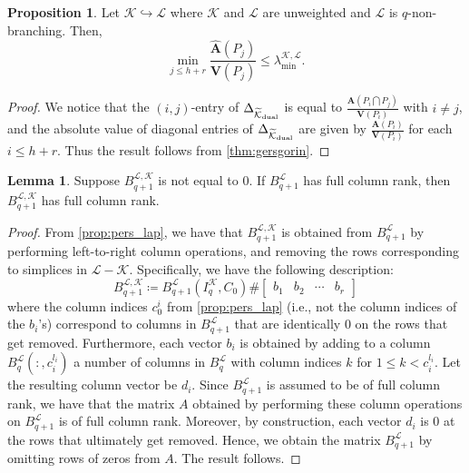 \documentclass{article}
\theoremstyle{definition}
\newtheorem{proposition}[theorem]{Proposition}
\newtheorem{lemma}[theorem]{Lemma}
\newcommand{\KK}{\mathcal{K}}
\newcommand{\LL}{\mathcal{L}}
\begin{document}
\begin{proposition}\label{prop:realcheeger1}
Let $\KK\hookrightarrow \LL$ where $\KK$ and $\LL$ are unweighted and $\LL$ is $q$-non-branching. Then,
\[
\min\limits_{j\leq h+r}\frac{\widehat{\mathbf{A}}(P_j)}{\mathbf{V}(P_j)}\leq \lambda_{\mathrm{min}}^{\KK, \LL}.\]
\end{proposition}

\begin{proof}
We notice that the $(i, j)$-entry of $\Delta_{\widetilde{\KK}_{\textrm{\textrm{dual}}}}$ is equal to $\frac{\mathbf{A}(P_i\bigcap P_j)}{\mathbf{V}(P_i)}$ with $i\neq j$,
and the absolute value of diagonal entries of $\Delta_{\widetilde{\KK}_{\textrm{\textrm{dual}}}}$ are given by $\frac{\mathbf{A}(P_i)}{\mathbf{V}(P_i)}$ for each $i\leq h+r$.
Thus the result follows from \cref{thm:gersgorin}.
\end{proof}


\begin{lemma}\label{lemma:full_col_rnk}
Suppose $B_{q+1}^{\LL, \KK}$ is not equal to $0$.
If $B_{q+1}^\LL$ has full column rank,
then $B_{q+1}^{\LL, \KK}$ has full column rank.
\end{lemma}
\begin{proof}
    From \cref{prop:pers_lap}, we have that $B_{q+1}^{\LL, \KK}$ is obtained from $B_{q+1}^\LL$ by performing left-to-right column operations, and removing the rows corresponding to simplices in $\LL-\KK$. Specifically, we have the following description: 
    \[B_{q+1}^{\LL, \KK}
    \coloneqq 
    B_{q+1}^\LL(I_q^{\KK}, C_0) \#
    \begin{bmatrix}
    b_1 & b_2 & \cdots & b_r
    \end{bmatrix}
    \]
    where the column indices $c_0^i$ from \cref{prop:pers_lap} (i.e., not the column indices of the $b_i$'s) correspond to columns in $B_{q+1}^\LL$ that are identically 0 on the rows that get removed. Furthermore,  each vector $b_i$ is obtained by adding to a column $B_q^\LL(:,c_i^{l_i})$ a number of columns in $B_q^\LL$ with column indices $k$ for $1\leq k< c_i^{l_i}$. Let the resulting column vector be $d_{i}$. Since $B_{q+1}^\LL$ is assumed to be of full column rank, we have that the matrix $A$ obtained by performing these column operations on $B_{q+1}^\LL$ is of full column rank. Moreover, by construction, each vector $d_{i}$ is 0 at the rows that ultimately get removed. Hence, we obtain the matrix $B_{q+1}^\LL$ by omitting rows of zeros from $A$. The result follows.
\end{proof}
\end{document}
